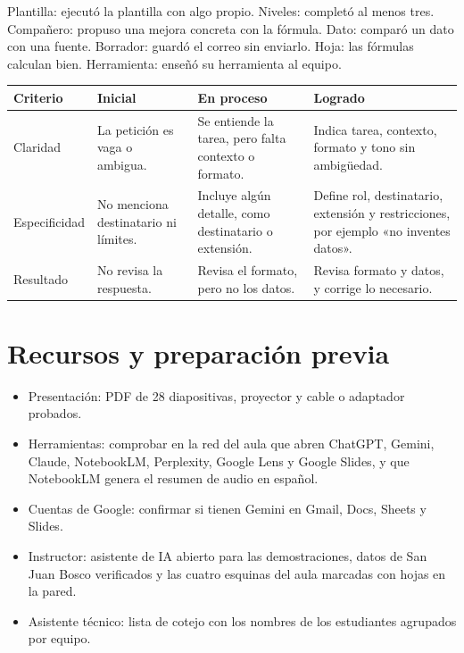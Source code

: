 \documentclass[11pt,a4paper]{article}
\begin{document}
\smallskip
\textcolor{gris}{Plantilla: ejecutó la plantilla con algo propio. Niveles: completó al menos tres. Compañero: propuso una mejora concreta con la fórmula. Dato: comparó un dato con una fuente. Borrador: guardó el correo sin enviarlo. Hoja: las fórmulas calculan bien. Herramienta: enseñó su herramienta al equipo.}

\medskip
\noindent\begin{tabularx}{\textwidth}{@{}p{2.6cm}XXX@{}}\toprule
\textbf{Criterio} & \textbf{Inicial} & \textbf{En proceso} & \textbf{Logrado}\\\midrule
Claridad & La petición es vaga o ambigua. & Se entiende la tarea, pero falta contexto o formato. & Indica tarea, contexto, formato y tono sin ambigüedad.\\
Especificidad & No menciona destinatario ni límites. & Incluye algún detalle, como destinatario o extensión. & Define rol, destinatario, extensión y restricciones, por ejemplo «no inventes datos».\\
Resultado & No revisa la respuesta. & Revisa el formato, pero no los datos. & Revisa formato y datos, y corrige lo necesario.\\\bottomrule
\end{tabularx}
\normalsize

\section{Recursos y preparación previa}
\begin{itemize}
\item Presentación: PDF de 28 diapositivas, proyector y cable o adaptador probados.
\item Herramientas: comprobar en la red del aula que abren ChatGPT, Gemini, Claude, NotebookLM, Perplexity, Google Lens y Google Slides, y que NotebookLM genera el resumen de audio en español.
\item Cuentas de Google: confirmar si tienen Gemini en Gmail, Docs, Sheets y Slides.
\item Instructor: asistente de IA abierto para las demostraciones, datos de San Juan Bosco verificados y las cuatro esquinas del aula marcadas con hojas en la pared.
\item Asistente técnico: lista de cotejo con los nombres de los estudiantes agrupados por equipo.
\end{itemize}
\end{document}
